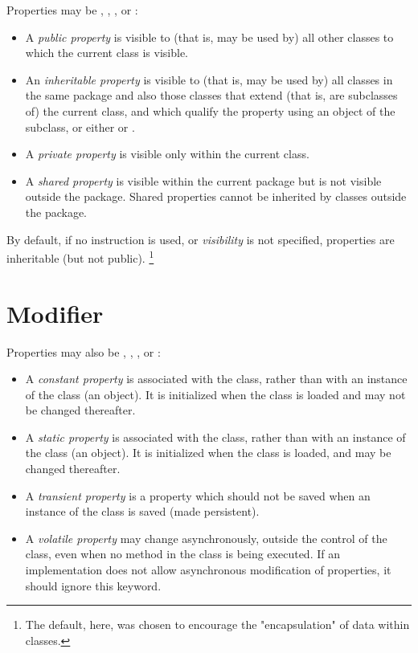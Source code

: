Properties may be , ,
, or :
\begin{itemize}
\item A \emph{public property} is visible to (that is, may be used by)
all other classes to which the current class is visible.
\item An \emph{inheritable property} is visible to (that is, may be used
by) all classes in the same package and also those classes that extend
(that is, are subclasses of) the current class, and which qualify the
property using an object of the subclass, or either 
or .
\item A \emph{private property} is visible only within the current
class.
\item 
A \emph{shared property} is visible within the current package
but is not visible outside the package.  Shared properties cannot be
inherited by classes outside the package.
\end{itemize}
 
By default, if no  instruction is used,
or \emph{visibility} is not specified, properties
are inheritable (but not public).
\footnote{
The default, here, was chosen to encourage the "encapsulation" of
data within classes.
}
\section{Modifier}\label{refpropmod}
 
Properties may also be , ,
, or :
\begin{itemize}
\item 
A \emph{constant property} is associated with the class, rather
than with an instance of the class (an object).
It is initialized when the class is loaded and may not be changed
thereafter.
\item 
A \emph{static property} is associated with the class, rather
than with an instance of the class (an object).
It is initialized when the class is loaded, and may be changed
thereafter.
\item 
A \emph{transient property} is a property which should not be saved when
an instance of the class is saved (made persistent).
\item 
A \emph{volatile property} may change asynchronously, outside the
control of the class, even when no method in the class is being
executed.
If an implementation does not allow asynchronous modification of
properties, it should ignore this keyword.
\end{itemize}
 
